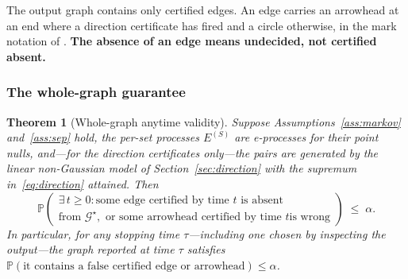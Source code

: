 \documentclass[pdflatex,sn-apa]{sn-jnl}
\theoremstyle{thmstyleone}%
\newtheorem{theorem}{Theorem}%
\theoremstyle{thmstyletwo}%
\theoremstyle{thmstylethree}%
\newcommand{\Gstar}{\mathcal{G}^{\star}}
\newcommand{\Prob}{\mathbb{P}}
\begin{document}
The output graph contains only certified edges. An edge carries an arrowhead
at an end where a direction certificate has fired and a circle otherwise, in
the mark notation of \citet{richardson2002ancestral}. \textbf{The absence of
an edge means undecided, not certified absent.}

\subsubsection{The whole-graph guarantee}\label{sec:theorem}

\begin{theorem}[Whole-graph anytime validity]\label{thm:main}
Suppose Assumptions~\ref{ass:markov} and~\ref{ass:sep} hold, the per-set
processes $E^{(S)}$ are e-processes for their point nulls, and---for the
direction certificates only---the pairs are generated by the linear
non-Gaussian model of Section~\ref{sec:direction} with the supremum
in~\eqref{eq:direction} attained. Then
\begin{equation}\label{eq:mainbound}
\Prob\left(
\begin{array}{c}
\exists\, t \ge 0 : \text{some edge certified by time $t$ is absent} \\[-1pt]
\text{from } \Gstar, \text{ or some arrowhead certified by time $t$
  is wrong}
\end{array}
\right) \;\le\; \alpha .
\end{equation}
In particular, for \emph{any} stopping time $\tau$---including one chosen by
inspecting the output---the graph reported at time $\tau$ satisfies
$\Prob(\text{it contains a false certified edge or arrowhead}) \le \alpha$.
\end{theorem}
\end{document}
